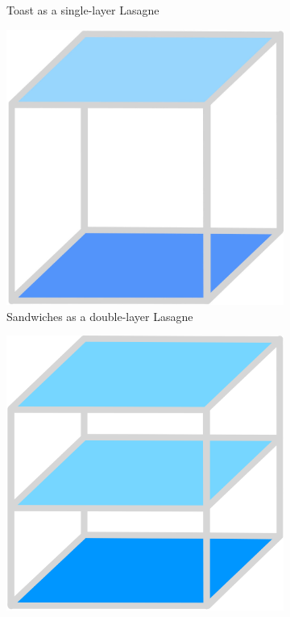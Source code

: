 \documentclass{beamer}
\begin{document}
\begin{frame}
\begin{figure}
\begin{subfigure}{.24\textwidth}
          \caption{\label{fig:toast-lasagne}Toast as a single-layer Lasagne}
        \end{subfigure}
        \begin{subfigure}{.24\textwidth}
          \centering
          \includegraphics[width=\linewidth]{images/cube_rule_of_food/sandwich/18_sandwich.jpg}
          \caption{\label{fig:sandwich-lasagne}Sandwiches as a double-layer Lasagne}
        \end{subfigure}
        \begin{subfigure}{.24\textwidth}
          \centering
          \includegraphics[width=\linewidth]{images/cube_rule_of_food/cake/32_cake.png}

\end{subfigure}
\end{figure}
\end{frame}
\end{document}
